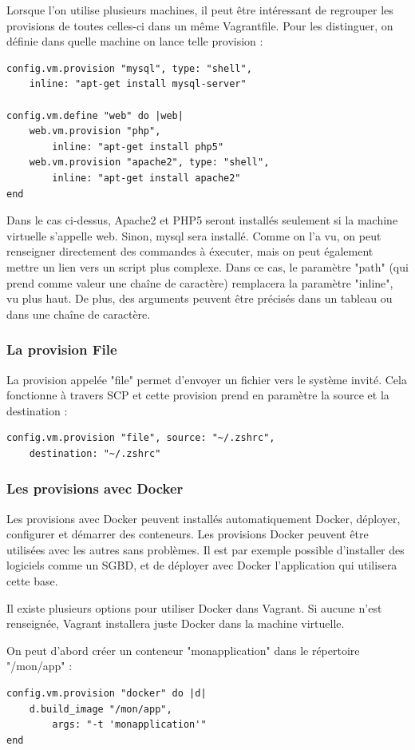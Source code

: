 \documentclass[12pt,a4paper]{article}
\begin{document}
Lorsque l'on utilise plusieurs machines, il peut être intéressant de regrouper les provisions de toutes celles-ci dans un même Vagrantfile. Pour les distinguer, on définie dans quelle machine on lance telle provision :
\begin{lstlisting}
config.vm.provision "mysql", type: "shell", 
	inline: "apt-get install mysql-server"

config.vm.define "web" do |web|
	web.vm.provision "php", 
		inline: "apt-get install php5"
	web.vm.provision "apache2", type: "shell", 
		inline: "apt-get install apache2"
end
\end{lstlisting}

Dans le cas ci-dessus, Apache2 et PHP5 seront installés seulement si la machine virtuelle s'appelle web. Sinon, mysql sera installé. Comme on l'a vu, on peut renseigner directement des commandes à éxecuter, mais on peut également mettre un lien vers un script plus complexe. Dans ce cas, le paramètre "path" (qui prend comme valeur une chaîne de caractère) remplacera la paramètre "inline", vu plus haut. De plus, des arguments peuvent être précisés dans un tableau ou dans une chaîne de caractère.

\subsubsection{La provision File}
La provision appelée "file" permet d'envoyer un fichier vers le système invité. Cela fonctionne à travers SCP et cette provision prend en paramètre la source et la destination :
\begin{lstlisting}
config.vm.provision "file", source: "~/.zshrc", 
	destination: "~/.zshrc"
\end{lstlisting}

\subsubsection{Les provisions avec Docker}
Les provisions avec Docker peuvent installés automatiquement Docker, déployer, configurer et démarrer des conteneurs. Les provisions Docker peuvent être utilisées avec les autres sans problèmes. Il est par exemple possible d'installer des logiciels comme un SGBD, et de déployer avec Docker l'application qui utilisera cette base.

Il existe plusieurs options pour utiliser Docker dans Vagrant. Si aucune n'est renseignée, Vagrant installera juste Docker dans la machine virtuelle.

On peut d'abord créer un conteneur "monapplication" dans le répertoire "/mon/app" :
\begin{lstlisting}
config.vm.provision "docker" do |d|
    d.build_image "/mon/app",
		args: "-t 'monapplication'"
end
\end{lstlisting}
\end{document}
